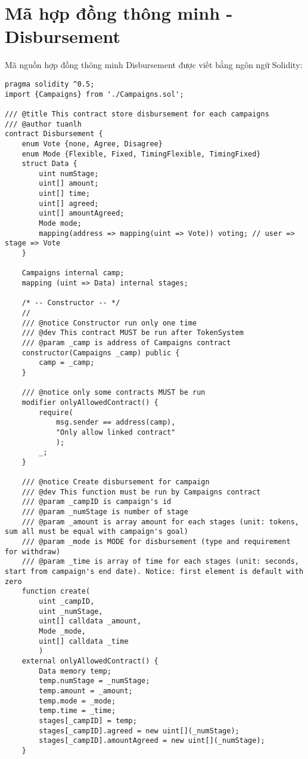 \documentclass[../main-report.tex]{subfiles}
\begin{document}
\chapter{Mã hợp đồng thông minh - Disbursement}
Mã nguồn hợp đồng thông minh Disbursement được viết bằng ngôn ngữ Solidity:

\begin{lstlisting}
pragma solidity ^0.5;
import {Campaigns} from './Campaigns.sol';

/// @title This contract store disbursement for each campaigns
/// @author tuanlh
contract Disbursement {
    enum Vote {none, Agree, Disagree}
    enum Mode {Flexible, Fixed, TimingFlexible, TimingFixed}
    struct Data {
        uint numStage;
        uint[] amount;
        uint[] time;
        uint[] agreed;
        uint[] amountAgreed;
        Mode mode;
        mapping(address => mapping(uint => Vote)) voting; // user => stage => Vote
    }

    Campaigns internal camp;
    mapping (uint => Data) internal stages;

    /* -- Constructor -- */
    //
    /// @notice Constructor run only one time
    /// @dev This contract MUST be run after TokenSystem
    /// @param _camp is address of Campaigns contract
    constructor(Campaigns _camp) public {
        camp = _camp;
    }

    /// @notice only some contracts MUST be run
    modifier onlyAllowedContract() {
        require(
            msg.sender == address(camp),
            "Only allow linked contract"
            );
        _;
    }

    /// @notice Create disbursement for campaign
    /// @dev This function must be run by Campaigns contract
    /// @param _campID is campaign's id
    /// @param _numStage is number of stage
    /// @param _amount is array amount for each stages (unit: tokens, sum all must be equal with campaign's goal)
    /// @param _mode is MODE for disbursement (type and requirement for withdraw)
    /// @param _time is array of time for each stages (unit: seconds, start from campaign's end date). Notice: first element is default with zero
    function create(
        uint _campID,
        uint _numStage,
        uint[] calldata _amount,
        Mode _mode,
        uint[] calldata _time
        )
    external onlyAllowedContract() {
        Data memory temp;
        temp.numStage = _numStage;
        temp.amount = _amount;
        temp.mode = _mode;
        temp.time = _time;
        stages[_campID] = temp;
        stages[_campID].agreed = new uint[](_numStage);
        stages[_campID].amountAgreed = new uint[](_numStage);
    }


\end{lstlisting}
\end{document}
